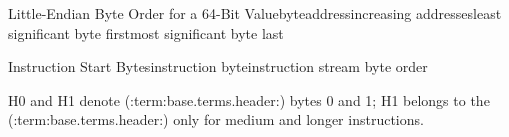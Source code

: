 \begin{BedrockListedByteOrderDiagram}{Little-Endian Byte Order for a 64-Bit Value}{byte}{address}{increasing addresses}{least significant byte first}{most significant byte last}
\end{BedrockListedByteOrderDiagram}

\begin{BedrockListedByteOrderDiagram}{Instruction Start Bytes}{instruction byte}{}{instruction stream byte order}{}{}
\end{BedrockListedByteOrderDiagram}

H0 and H1 denote (:term:base.terms.header:) bytes 0 and 1; H1 belongs to the (:term:base.terms.header:) only for medium and longer instructions.
